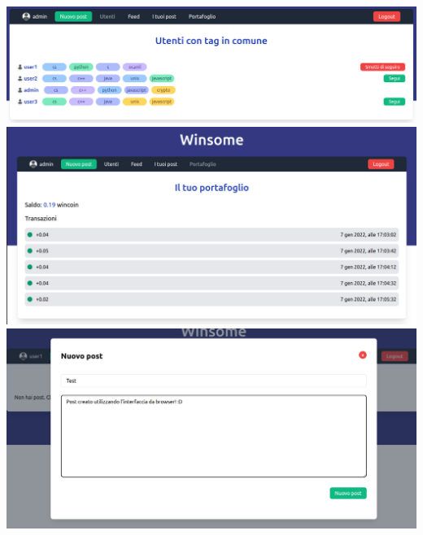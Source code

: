 \documentclass[a4paper,8pt]{article} %
\begin{document}
\includegraphics[width=\textwidth]{users.png}\vspace*{0.9cm}
\includegraphics[width=\textwidth]{wallet.png}\vspace*{0.9cm}
\includegraphics[width=\textwidth]{newpost.png}
\end{document}
